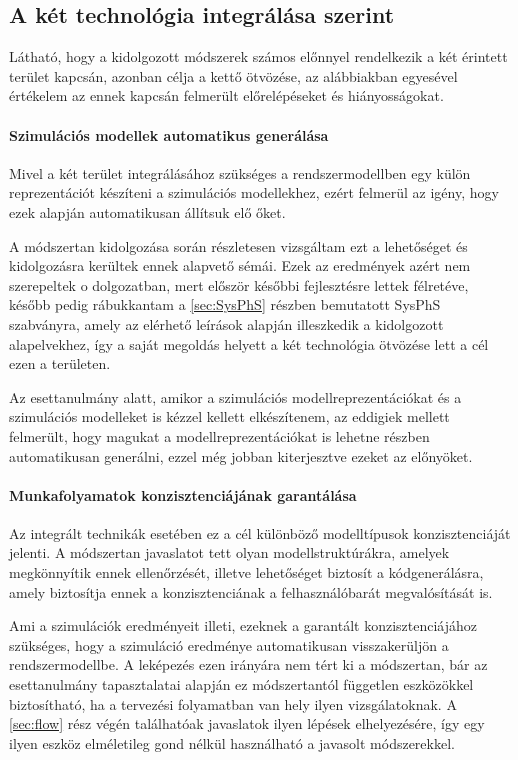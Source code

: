         \subsection{A két technológia integrálása szerint}
        Látható, hogy a kidolgozott módszerek számos előnnyel rendelkezik a két érintett terület kapcsán, azonban célja a kettő ötvözése, az alábbiakban egyesével értékelem az ennek kapcsán felmerült előrelépéseket és hiányosságokat.

            \paragraph{Szimulációs modellek automatikus generálása}
            Mivel a két terület integrálásához szükséges a rendszermodellben egy külön reprezentációt készíteni a szimulációs modellekhez, ezért felmerül az igény, hogy ezek alapján automatikusan állítsuk elő őket.
            
            A módszertan kidolgozása során részletesen vizsgáltam ezt a lehetőséget és kidolgozásra kerültek ennek alapvető sémái. Ezek az eredmények azért nem szerepeltek o dolgozatban, mert először későbbi fejlesztésre lettek félretéve, később pedig rábukkantam a \ref{sec:SysPhS} részben bemutatott SysPhS
            szabványra, amely az elérhető leírások alapján illeszkedik a kidolgozott alapelvekhez, így a saját megoldás helyett a két technológia ötvözése lett a cél ezen a területen.
            
            Az esettanulmány alatt, amikor a szimulációs modellreprezentációkat és a szimulációs modelleket is kézzel kellett elkészítenem, az eddigiek mellett felmerült, hogy magukat a modellreprezentációkat is lehetne részben automatikusan generálni, ezzel még jobban kiterjesztve ezeket az előnyöket.

            \paragraph{Munkafolyamatok konzisztenciájának garantálása}
            Az integrált technikák esetében ez a cél különböző modelltípusok konzisztenciáját jelenti. A módszertan javaslatot tett olyan modellstruktúrákra, amelyek megkönnyítik ennek ellenőrzését, illetve lehetőséget biztosít a kódgenerálásra, amely biztosítja ennek a konzisztenciának a felhasználóbarát megvalósítását is.
            
            Ami a szimulációk eredményeit illeti, ezeknek a garantált konzisztenciájához szükséges, hogy a szimuláció eredménye automatikusan visszakerüljön a rendszermodellbe.
            A leképezés ezen irányára nem tért ki a módszertan, bár az esettanulmány tapasztalatai alapján ez módszertantól független eszközökkel biztosítható, ha a tervezési folyamatban van hely ilyen vizsgálatoknak.
            A \ref{sec:flow} rész végén találhatóak javaslatok ilyen lépések elhelyezésére, így egy ilyen eszköz elméletileg gond nélkül használható a javasolt módszerekkel.

